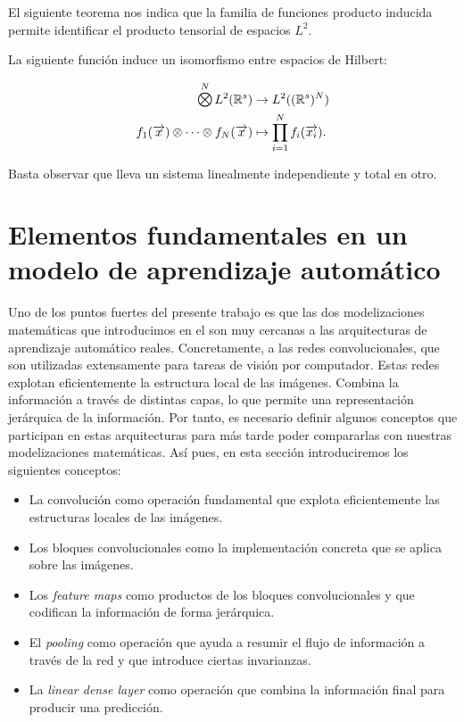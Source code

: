 El siguiente teorema nos indica que la familia de funciones producto inducida permite identificar el producto tensorial de espacios $L^2$.

\begin{teorema}
	La siguiente función induce un isomorfismo entre espacios de Hilbert:

	\begin{equation}
		\begin{split}
			\MediumOtimes^{N} L^2(\R^s) &\to L^2((\R^s)^N) \\
			f_1(\nv{x}) \otimes \cdots \otimes f_N(\nv{x}) &\mapsto \prod_{i = 1}^N f_i(\nv{x_i}).
		\end{split}
	\end{equation}

	Basta observar que lleva un sistema linealmente independiente y total en otro.
\end{teorema}

\section{Elementos fundamentales en un modelo de aprendizaje automático} \label{sec:piezas_machine_learning_matematicas}

Uno de los puntos fuertes del presente trabajo es que las dos modelizaciones matemáticas que introducimos en el  son muy cercanas a las arquitecturas de aprendizaje automático reales. Concretamente, a las redes convolucionales, que son utilizadas extensamente para tareas de visión por computador. Estas redes explotan eficientemente la estructura local de las imágenes. Combina la información a través de distintas capas, lo que permite una representación jerárquica de la información. Por tanto, es necesario definir algunos conceptos que participan en estas arquitecturas para más tarde poder compararlas con nuestras modelizaciones matemáticas. Así pues, en esta sección introduciremos los siguientes conceptos:

\begin{itemize}
    \item La convolución como operación fundamental que explota eficientemente las estructuras locales de las imágenes.
    \item Los bloques convolucionales como la implementación concreta que se aplica sobre las imágenes.
    \item Los \textit{feature maps} como productos de los bloques convolucionales y que codifican la información de forma jerárquica.
    \item El \textit{pooling} como operación que ayuda a resumir el flujo de información a través de la red y que introduce ciertas invarianzas.
    \item La \textit{linear dense layer} como operación que combina la información final para producir una predicción.
\end{itemize}


